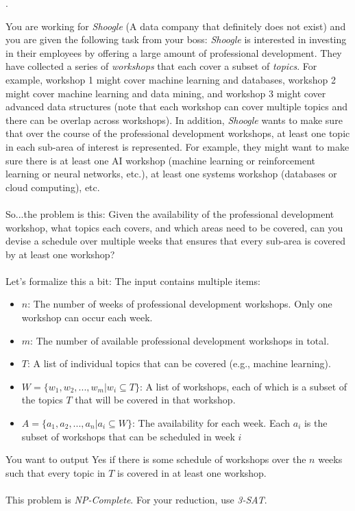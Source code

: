 \documentclass[12pt]{article}
\newcounter{quesnum}
\newcommand{\question}[2][??]{
\begin{list}{\labelitemi}{\leftmargin=2em}
\item [\arabic{quesnum}.] {} {#2}
\end{list}
\addtocounter{quesnum}{1}
}
\begin{document}
\question[3]{
You are working for \emph{Shoogle} (A data company that definitely does not exist) and you are given the following task from your boss: \emph{Shoogle} is interested in investing in their employees by offering a large amount of professional development. They have collected a series of \emph{workshops} that each cover a subset of \emph{topics}. For example, workshop 1 might cover machine learning and databases, workshop 2 might cover machine learning and data mining, and workshop 3 might cover advanced data structures (note that each workshop can cover multiple topics and there can be overlap across workshops). In addition, \emph{Shoogle} wants to make sure that over the course of the professional development workshops, at least one topic in each sub-area of interest is represented. For example, they might want to make sure there is at least one AI workshop (machine learning or reinforcement learning or neural networks, etc.), at least one systems workshop (databases or cloud computing), etc.\\
\\
So...the problem is this: Given the availability of the professional development workshop, what topics each covers, and which areas need to be covered, can you devise a schedule over multiple weeks that ensures that every sub-area is covered by at least one workshop?\\
\\
Let's formalize this a bit: The input contains multiple items:

\begin{itemize}
    \item $n$: The number of weeks of professional development workshops. Only one workshop can occur each week.
    \item $m$: The number of available professional development workshops in total.
    \item $T$: A list of individual topics that can be covered (e.g., machine learning).
    \item $W=\{w_1,w_2,...,w_m | w_i \subseteq T\}$: A list of workshops, each of which is a subset of the topics $T$ that will be covered in that workshop.
    \item $A=\{a_1,a_2,...,a_n | a_i \subseteq W\}$: The availability for each week. Each $a_i$ is the subset of workshops that can be scheduled in week $i$
\end{itemize}

You want to output Yes if there is some schedule of workshops over the $n$ weeks such that every topic in $T$ is covered in at least one workshop.\\
\\
This problem is \emph{NP-Complete}. For your reduction, use \emph{3-SAT}.
}
\end{document}
